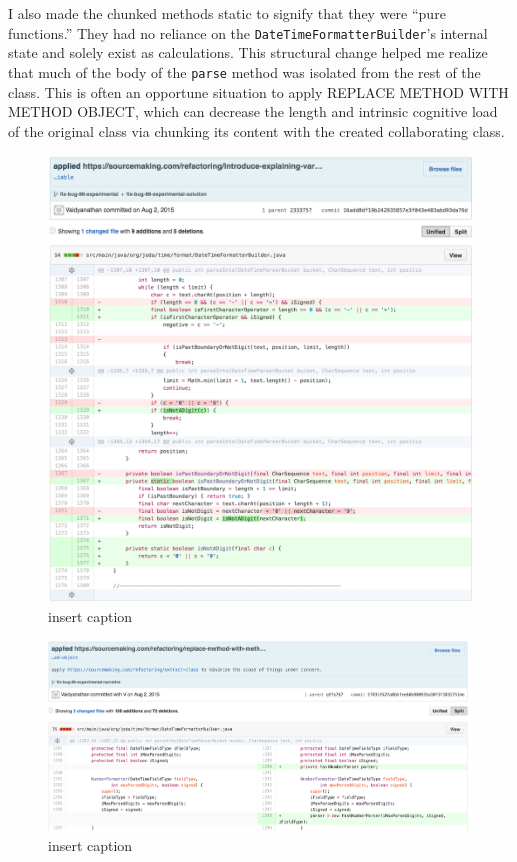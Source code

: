 I also made the chunked methods static to signify that they were “pure functions.” They had no reliance on the \texttt{DateTimeFormatterBuilder}’s internal state and solely exist as calculations. This structural change helped me realize that much of the body of the \texttt{parse} method was isolated from the rest of the class. This is often an opportune situation to apply REPLACE METHOD WITH METHOD OBJECT, which can decrease the length and intrinsic cognitive load of the original class via chunking its content with the created collaborating class.

\begin{figure}[H]
	\centering
	\includegraphics[width=\linewidth]{code4}
	\caption{insert caption}
\end{figure}
\begin{figure}[H]
	\centering
	\includegraphics[width=\linewidth]{code5}
	\caption{insert caption}
\end{figure}

